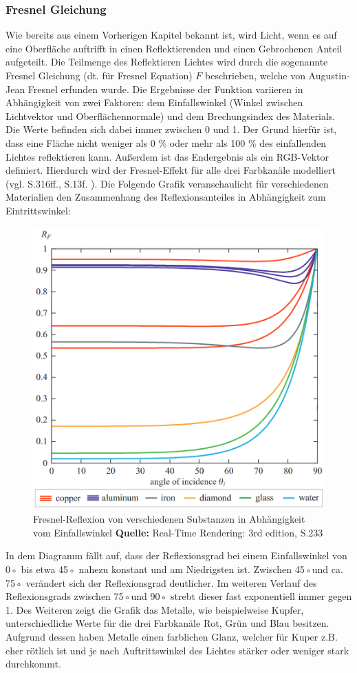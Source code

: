 \documentclass[
  11pt,
  a4paper,
  oneside
  ]{article}
\begin{document}
\subsubsection{Fresnel Gleichung}\label{sec:fresnel}
Wie bereits aus einem Vorherigen Kapitel bekannt ist, wird Licht, wenn es auf eine Oberfläche auftrifft in einen Reflektierenden und einen Gebrochenen Anteil aufgeteilt. Die Teilmenge des Reflektieren Lichtes wird durch die sogenannte Fresnel Gleichung (dt. für Fresnel Equation) $F$ beschrieben, welche von Augustin-Jean Fresnel erfunden wurde. Die Ergebnisse der Funktion variieren in Abhängigkeit von zwei Faktoren: dem Einfallswinkel (Winkel zwischen Lichtvektor und Oberflächennormale) und dem Brechungsindex des Materials. Die Werte befinden sich dabei immer zwischen 0 und 1. Der Grund hierfür ist, dass eine Fläche nicht weniger als 0 \% oder mehr als 100 \% des einfallenden Lichtes reflektieren kann. Außerdem ist das Endergebnis als ein RGB-Vektor definiert. Hierdurch wird der Fresnel-Effekt für alle drei Farbkanäle modelliert 
(vgl. S.316ff.\cite{realTimeRendering4th}, S.13f. \cite{rtrPaper}). Die Folgende Grafik veranschaulicht für verschiedenen Materialien den Zusammenhang des Reflexionsanteiles in Abhängigkeit zum Eintrittswinkel:
\begin{figure}[H]
  \centering
  \includegraphics*[width=0.70 \textwidth]{images/fresnelDiagram.png}
  \caption{Fresnel-Reflexion von verschiedenen Substanzen in Abhängigkeit vom Einfallswinkel \footnotesize\textbf{Quelle:} Real-Time Rendering: 3rd edition, S.233 \cite{RTR3}}
  \label{fig:img5}
\end{figure}

In dem Diagramm fällt auf, dass der Reflexionsgrad bei einem Einfallswinkel von 0◦ bis etwa 45◦ nahezu konstant und am Niedrigsten ist.  Zwischen 45◦und ca. 75◦ verändert sich der Reflexionsgrad deutlicher. Im weiteren Verlauf des Reflexionsgrads zwischen 75◦und 90◦ strebt dieser fast exponentiell immer gegen 1. Des Weiteren zeigt die Grafik das Metalle, wie beispielweise Kupfer, unterschiedliche Werte für die drei Farbkanäle Rot, Grün und Blau besitzen. Aufgrund dessen haben Metalle einen farblichen Glanz, welcher für Kuper z.B. eher rötlich ist und je nach Auftrittswinkel des Lichtes stärker oder weniger stark durchkommt. 
\end{document}
